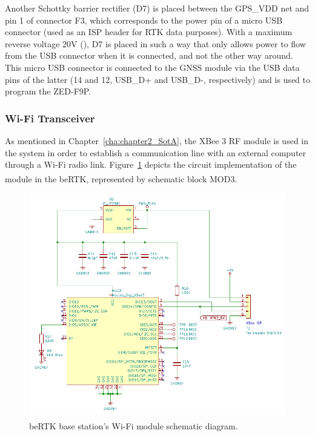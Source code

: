 Another Schottky barrier rectifier (D7) is placed between the GPS\_VDD net and pin 1 of connector F3, which corresponds to the power pin of a micro USB connector (used as an ISP header for RTK data purposes). With a maximum reverse voltage 20V (\cite{PMEG2010ER}), D7 is placed in such a way that only allows power to flow from the USB connector when it is connected, and not the other way around. This micro USB connector is connected to the GNSS module via the USB data pins of the latter (14 and 12, USB\_D+ and USB\_D-, respectively) and is used to program the ZED-F9P.



\subsubsection{Wi-Fi Transceiver}\label{sec:3233_XBEE3}

As mentioned in Chapter~\ref{cha:chapter2_SotA}, the XBee 3 RF module is used in the system in order to establish a communication line with an external computer through a Wi-Fi radio link. Figure~\ref{fig:XBEE3_circuit} depicts the circuit implementation of the module in the beRTK\textsuperscript{\textregistered}, represented by schematic block MOD3.

\begin{figure}[h]
	\centering
	\includegraphics[width=1.0\textwidth]{Chapters/Figures/chapter3/Modules_XBEE3.pdf}
	\caption{beRTK\textsuperscript{\textregistered} base station's Wi-Fi module schematic diagram.}
	\label{fig:XBEE3_circuit}
\end{figure}

